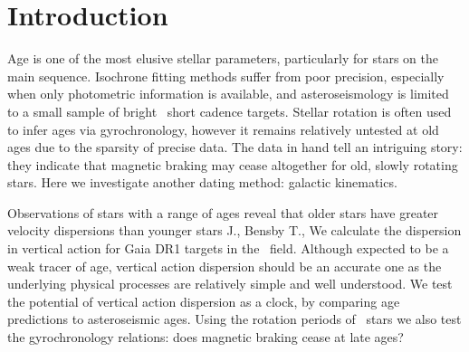 \section{Introduction}

Age is one of the most elusive stellar parameters, particularly for stars on
the main sequence.
Isochrone fitting methods suffer from poor precision, especially when only
photometric information is available, and asteroseismology is limited to a
small sample of bright \kepler\ short cadence targets.
Stellar rotation is often used to infer ages via gyrochronology, however it
remains relatively untested at old ages due to the sparsity of precise data.
The data in hand tell an intriguing story: they indicate that magnetic braking
may cease altogether for old, slowly rotating stars.
Here we investigate another dating method: galactic kinematics.

Observations of stars with a range of ages reveal that older stars have
greater velocity dispersions than younger stars \citep[\eg][]{casagrande2011,
aumer2011}
J., Bensby T.,
We calculate the dispersion in vertical action for Gaia DR1 targets in the
\kepler\ field.
Although expected to be a weak tracer of age, vertical action dispersion
should be an accurate one as the underlying physical processes are relatively
simple and well understood.
We test the potential of vertical action dispersion as a clock, by comparing
age predictions to asteroseismic ages.
Using the rotation periods of \kepler\ stars we also test the gyrochronology
relations: does magnetic braking cease at late ages?

